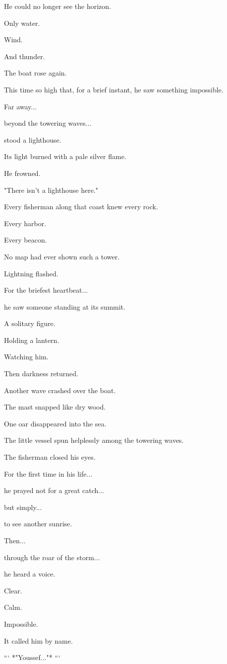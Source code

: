 \documentclass[12pt,openany]{book}
\begin{document}
He could no longer see the horizon.

Only water.

Wind.

And thunder.

The boat rose again.

This time so high that, for a brief instant, he saw something impossible.

Far away...

beyond the towering waves...

stood a lighthouse.

Its light burned with a pale silver flame.

He frowned.

"There isn't a lighthouse here."

Every fisherman along that coast knew every rock.

Every harbor.

Every beacon.

No map had ever shown such a tower.

Lightning flashed.

For the briefest heartbeat...

he saw someone standing at its summit.

A solitary figure.

Holding a lantern.

Watching him.

Then darkness returned.

Another wave crashed over the boat.

The mast snapped like dry wood.

One oar disappeared into the sea.

The little vessel spun helplessly among the towering waves.

The fisherman closed his eyes.

For the first time in his life...

he prayed not for a great catch...

but simply...

to see another sunrise.

Then...

through the roar of the storm...

he heard a voice.

Clear.

Calm.

Impossible.

It called him by name.

```
*"Youssef..."*
```
\end{document}

